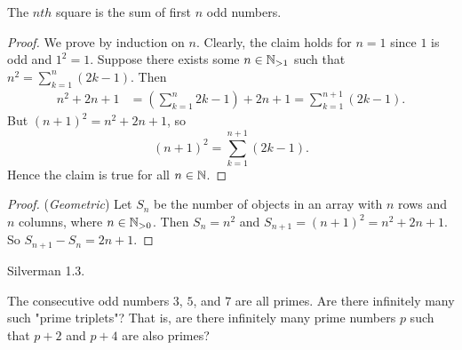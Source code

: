 \documentclass[10pt,twoside]{amsart}
\begin{document}
\begin{exercises}
{\begin{minipage}{\dimexpr\linewidth-2\fboxrule-2\fboxsep}
    \begin{claim*} The $nth$ square is the sum of first $n$ odd numbers.
    \end{claim*}
    \begin{proof}
    We prove by induction on $n$. Clearly, the claim holds for $n=1$ since $1$ is  odd and $1^2=1$. Suppose there exists some $n \in \mathbb{N}_{>1}$ such that $n^2=\sum_{k=1}^{n}(2k-1)$. Then 
    \begin{align*}
        n^2 + 2n+1 &= \left( \sum_{k=1}^{n} 2k-1\right) + 2n+1 = \sum_{k=1}^{n+1} (2k-1).
    \end{align*}
        But ${(n+1)}^2 = n^2+2n+1$, so \[{(n+1)}^2=\sum_{k=1}^{n+1} (2k-1).\]
        Hence the claim is true for all $n \in \mathbb{N}$.
    \end{proof}
        \begin{proof}{(\textit{Geometric})}
            Let $S_n$ be the number of objects in an array with $n$ rows and $n$ columns, where $n \in \mathbb{N}_{>0}$. Then $S_n=n^2$ and $S_{n+1}=(n+1)^2 = n^2+2n+1$. So $S_{n+1}-S_n = 2n+1$. 
        \end{proof} 
    \end{minipage}} 



    \item Silverman 1.3. 

        The consecutive odd numbers $3$, $5$, and $7$ are all primes. Are there infinitely many such "prime triplets"? That is, are there infinitely many prime numbers $p$ such that $p+2$ and $p+4$ are also primes?



 \end{exercises}
\end{document}
